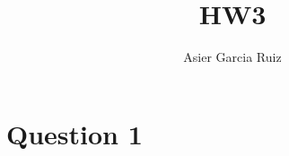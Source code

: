 \documentclass{article}
\title{HW3}
\author{Asier Garcia Ruiz}
\begin{document}
\maketitle

\section*{Question 1}
\end{document}
